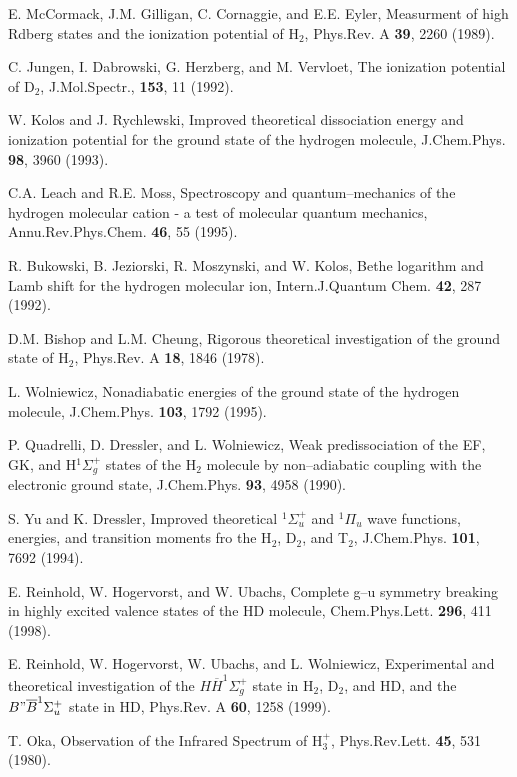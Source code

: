 {{\begin{thebibliography}{999}
{
E. McCormack, J.M. Gilligan, C. Cornaggie, and E.E. Eyler,
Measurment of high Rdberg states and the ionization potential
of H$_2$,
Phys.Rev. A {\bf 39}, 2260 (1989).

C. Jungen, I. Dabrowski, G. Herzberg, and M. Vervloet,
The ionization potential of D$_2$,
J.Mol.Spectr., {\bf 153}, 11 (1992).

W. Kolos and J. Rychlewski,
Improved theoretical dissociation energy and
ionization potential for the ground state of the
hydrogen molecule,
J.Chem.Phys. {\bf 98}, 3960 (1993).


C.A. Leach and R.E. Moss,
Spectroscopy and quantum--mechanics of the hydrogen 
molecular cation - a test of molecular quantum mechanics,
Annu.Rev.Phys.Chem. {\bf 46}, 55 (1995). 


R. Bukowski, B. Jeziorski, R. Moszynski, and W. Kolos,
Bethe logarithm and Lamb shift for the hydrogen molecular 
ion,
Intern.J.Quantum Chem. {\bf 42}, 287 (1992).

D.M. Bishop and L.M. Cheung,
Rigorous theoretical investigation of the ground state of H$_2$,
Phys.Rev. A {\bf 18}, 1846 (1978).

L. Wolniewicz,
Nonadiabatic energies of the ground state of the hydrogen
molecule,
J.Chem.Phys. {\bf 103}, 1792 (1995).



P. Quadrelli, D. Dressler, and L. Wolniewicz,
Weak predissociation of the EF, GK, and H$^1\Sigma^+_g$ states
of the H$_2$ molecule by non--adiabatic coupling
with the electronic ground state,
J.Chem.Phys. {\bf 93}, 4958 (1990).


S. Yu and K. Dressler, 
Improved theoretical $^1\Sigma_u^+$ and $^1\Pi_u$ wave functions,
energies, and transition moments fro the H$_2$, D$_2$, and T$_2$,
J.Chem.Phys. {\bf 101}, 7692 (1994).

E. Reinhold, W. Hogervorst, and W. Ubachs,
Complete g--u symmetry breaking in highly excited valence states
of the HD molecule,
Chem.Phys.Lett. {\bf 296}, 411 (1998).

E. Reinhold, W. Hogervorst, W. Ubachs, and L. Wolniewicz,
Experimental and theoretical investigation of the 
$H\overline{H}^1\Sigma_g^+$ state in H$_2$, D$_2$, and HD,
and the $B"\overline{B}^1\Sigma_u^+$ state in HD,
Phys.Rev. A {\bf 60}, 1258 (1999).


T. Oka, 
Observation of the Infrared Spectrum of H$_3^+$, 
Phys.Rev.Lett. {\bf 45}, 531 (1980).

}
\end{thebibliography}}}
